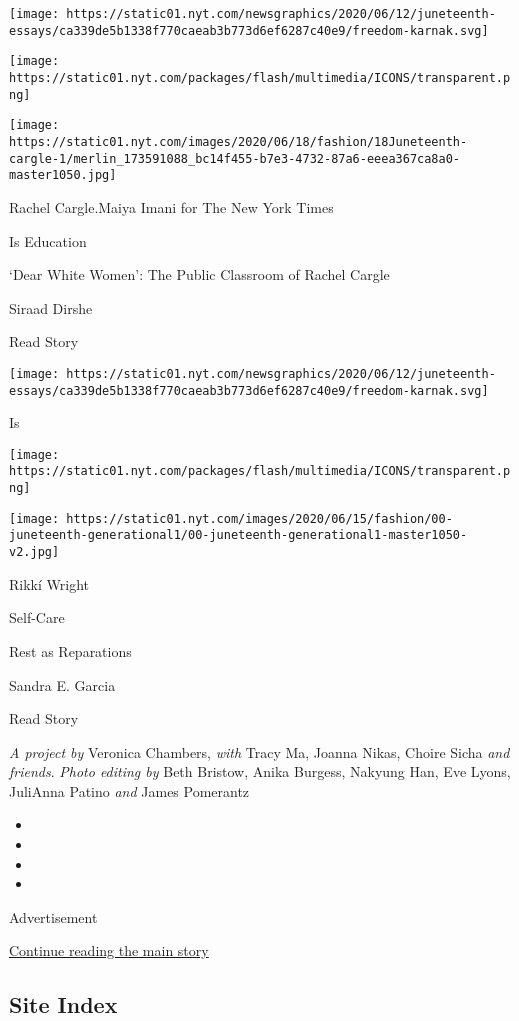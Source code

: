 \texttt{[image: https://static01.nyt.com/newsgraphics/2020/06/12/juneteenth-essays/ca339de5b1338f770caeab3b773d6ef6287c40e9/freedom-karnak.svg]}

\texttt{[image: https://static01.nyt.com/packages/flash/multimedia/ICONS/transparent.png]}

\texttt{[image: https://static01.nyt.com/images/2020/06/18/fashion/18Juneteenth-cargle-1/merlin\_173591088\_bc14f455-b7e3-4732-87a6-eeea367ca8a0-master1050.jpg]}

Rachel Cargle.Maiya Imani for The New York Times

Is Education

`Dear White Women': The Public Classroom of Rachel Cargle

Siraad Dirshe

Read Story

\href{https://www.nytimes.com/2020/06/18/style/self-care/healing-trauma-racism-wellness.html}{}

\texttt{[image: https://static01.nyt.com/newsgraphics/2020/06/12/juneteenth-essays/ca339de5b1338f770caeab3b773d6ef6287c40e9/freedom-karnak.svg]}

Is

\texttt{[image: https://static01.nyt.com/packages/flash/multimedia/ICONS/transparent.png]}

\texttt{[image: https://static01.nyt.com/images/2020/06/15/fashion/00-juneteenth-generational1/00-juneteenth-generational1-master1050-v2.jpg]}

Rikkí Wright

Self-Care

Rest as Reparations

Sandra E. Garcia

Read Story

\emph{A project by} Veronica Chambers, \emph{with} Tracy Ma, Joanna
Nikas, Choire Sicha \emph{and friends}. \emph{Photo editing by} Beth
Bristow, Anika Burgess, Nakyung Han, Eve Lyons, JuliAnna Patino
\emph{and} James Pomerantz

\begin{itemize}
\item
\item
\item
\item
\end{itemize}

Advertisement

\protect\hyperlink{after-bottom}{Continue reading the main story}

\hypertarget{site-index}{%
\subsection{Site Index}\label{site-index}}

